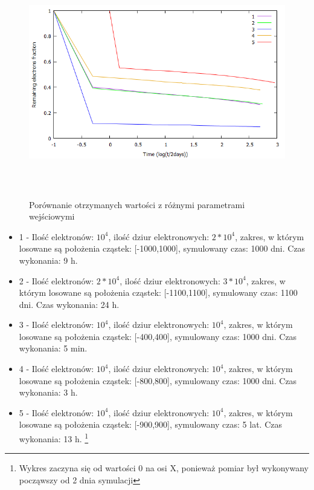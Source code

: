 \begin{figure}[H]
\centering
\includegraphics[width=17cm, height = 10cm]{wykres_all}
\caption{Porównanie otrzymanych wartości z różnymi parametrami wejściowymi}
\label{rys:1}
\end{figure}
\newpage
\begin{itemize}
\item 1 - Ilość elektronów: $10^{4}$, ilość dziur elektronowych: $2*10^{4}$, zakres, w którym losowane są położenia cząstek: [-1000,1000], symulowany czas: 1000 dni. Czas wykonania: 9 h.
\item 2 - Ilość elektronów: $2*10^{4}$, ilość dziur elektronowych: $3*10^{4}$, zakres, w którym losowane są położenia cząstek: [-1100,1100], symulowany czas: 1100 dni. Czas wykonania: 24 h.
\item 3 - Ilość elektronów: $10^{4}$, ilość dziur elektronowych: $10^{4}$, zakres, w którym losowane są położenia cząstek: [-400,400], symulowany czas: 1000 dni. Czas wykonania: 5 min.
\label{wykres:1}
\item 4 - Ilość elektronów: $10^{4}$, ilość dziur elektronowych: $10^{4}$, zakres, w którym losowane są położenia cząstek: [-800,800], symulowany czas: 1000 dni. Czas wykonania: 3 h.
\label{wykres:2}
\item 5 - Ilość elektronów: $10^{4}$, ilość dziur elektronowych: $10^{4}$, zakres, w którym losowane są położenia cząstek: [-900,900], symulowany czas: 5 lat. Czas wykonania: 13 h. \footnote{Wykres zaczyna się od wartości 0 na osi X, ponieważ pomiar był wykonywany począwszy od 2 dnia symulacji }
\end{itemize}






